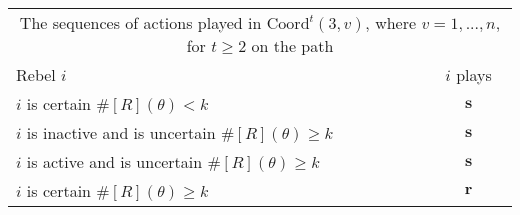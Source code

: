 \documentclass[12pt,letter]{article}
\newcommand{\Kappa}{\mathrm{Coord}}
\theoremstyle{definition}
\theoremstyle{remark}
\theoremstyle{claim}
\begin{document}
\begin{table}[!htbp]
\begin{center}
\begin{tabular}{l c}
\multicolumn{2}{c}{The sequences of actions played in $\Kappa^t(3,v)$, where $v=1,...,n$, for $t\geq 2$ on the path}\\
Rebel $i$ 	 	&  	$i$ plays		 \\
\hline
\hline
$i$ is certain $\#[R](\theta)<k$ 	& 	$\textbf{s}$	\\
$i$ is inactive and is uncertain $\#[R](\theta)\geq k$	& 	$ \textbf{s} $	\\
$i$ is active and is uncertain $\#[R](\theta)\geq k$ &  $ \textbf{s} $  \\
$i$ is certain $\#[R](\theta)\geq k$ &  $ \textbf{r} $  \\
\hline
\end{tabular}
\end{center}
\end{table}
\end{document}
